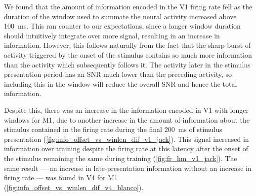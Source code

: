 We found that the amount of information encoded in the \ac{V1} firing rate fell as the duration of the window used to summate the neural activity increased above \SI{100}{\milli\second}.
This ran counter to our expectations, since a longer window duration should intuitively integrate over more signal, resulting in an increase in information.
However, this follows naturally from the fact that the sharp burst of activity triggered by the onset of the stimulus contains so much more information than the activity which subsequently follows it.
The activity later in the stimulus presentation period has an \ac{SNR} much lower than the preceding activity, so including this in the window will reduce the overall \ac{SNR} and hence the total information.

Despite this, there was an increase in the information encoded in \ac{V1} with longer windows for \ac{M1}, due to another increase in the amount of information about the stimulus contained in the firing rate during the final \SI{200}{\milli\second} of stimulus presentation (\autoref{fig:info_offset_vs_winlen_dif_v1_jack}).
This signal increased in information over training despite the firing rate at this latency after the onset of the stimulus remaining the same during training (\autoref{fig:fr_hm_v1_jack}).
The same result --- an increase in late-presentation information without an increase in firing rate --- was found in \ac{V4} for \ac{M1} (\autoref{fig:info_offset_vs_winlen_dif_v4_blanco}).

